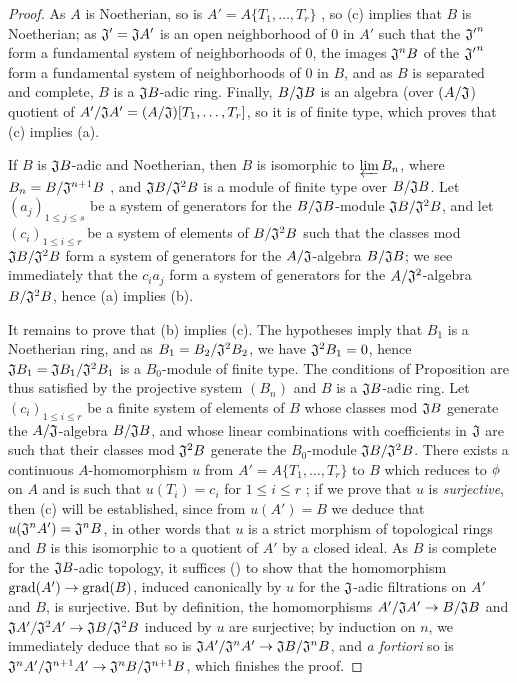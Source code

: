 \begin{proof}
\label{proof-0.7.5.5}
As $A$ is Noetherian, so is $A'=A\{T_1,\dots,T_r\}$ , so
(c) implies that $B$ is Noetherian; as $\mathfrak{J}'=\mathfrak{J}A'$ is an open neighborhood
of $0$ in $A'$ such that the ${\mathfrak{J}'}^n$ form a fundamental system of neighborhoods of
$0$, the images $\mathfrak{J}^n B$ of the ${\mathfrak{J}'}^n$ form a fundamental system of
neighborhoods of $0$ in $B$, and as $B$ is separated and complete, $B$ is a $\mathfrak{J}B$-adic
ring. Finally, $B/\mathfrak{J}B$ is an algebra (over $(A/\mathfrak{J}$) quotient of
$A'/\mathfrak{J}A'=(A/\mathfrak{J})[T_1,\dots,T_r]$, so it is of finite type, which proves that
(c) implies (a).

If $B$ is $\mathfrak{J}B$-adic and Noetherian, then $B$ is isomorphic to $\varprojlim B_n$, where
$B_n=B/\mathfrak{J}^{n+1}B$ , and $\mathfrak{J}B/\mathfrak{J}^2 B$
is a module of finite type over $B/\mathfrak{J}B$. Let $(a_j)_{1\leqslant j\leqslant s}$ be a
system of generators for the $B/\mathfrak{J}B$-module $\mathfrak{J}B/\mathfrak{J}^2 B$, and let
$(c_i)_{1\leqslant i\leqslant r}$ be a system of elements of $B/\mathfrak{J}^2 B$ such that the
classes
mod $\mathfrak{J}B/\mathfrak{J}^2 B$ form a system of generators for the $A/\mathfrak{J}$-algebra
$B/\mathfrak{J}B$; we see immediately that the $c_i a_j$ form a system of generators for the
$A/\mathfrak{J}^2$-algebra $B/\mathfrak{J}^2 B$, hence (a) implies (b).

It remains to prove that (b) implies (c). The hypotheses imply that $B_1$ is a Noetherian ring, and
as $B_1=B_2/\mathfrak{J}^2 B_2$, we have $\mathfrak{J}^2 B_1=0$, hence
$\mathfrak{J}B_1=\mathfrak{J}B_1/\mathfrak{J}^2 B_1$ is a $B_0$-module of finite type. The
conditions of Proposition  are thus satisfied by the projective
system $(B_n)$ and $B$ is a $\mathfrak{J}B$-adic ring. Let $(c_i)_{1\leqslant i\leqslant r}$ be a
finite system of elements of $B$ whose classes mod $\mathfrak{J}B$ generate the
$A/\mathfrak{J}$-algebra $B/\mathfrak{J}B$, and whose linear combinations with coefficients in
$\mathfrak{J}$ are such that their classes mod $\mathfrak{J}^2 B$ generate the $B_0$-module
$\mathfrak{J}B/\mathfrak{J}^2 B$. There exists a continuous $A$-homomorphism $u$ from
$A'=A\{T_1,\dots,T_r\}$ to $B$ which reduces to $\phi$ on $A$ and is such that $u(T_i)=c_i$ for
$1\leqslant i\leqslant r$ ; if we prove that $u$ is \emph{surjective},
then (c) will be established, since from $u(A')=B$ we deduce that
$u(\mathfrak{J}^n A')=\mathfrak{J}^n B$, in other words that $u$ is a strict morphism of topological
rings and $B$ is this isomorphic to a quotient of $A'$ by a closed ideal. As $B$ is complete for the
$\mathfrak{J}B$-adic topology, it suffices (\cite[p.~18--07]{I-1}) to show that the homomorphism
$\grad(A')\to\grad(B)$, induced canonically by $u$ for the $\mathfrak{J}$-adic filtrations on
$A'$ and $B$, is surjective. But by definition, the homomorphisms
$A'/\fk{J}A'\to B/\fk{J}B$ and
$\fk{J}A'/\fk{J}^2 A'\to\fk{J}B/\fk{J}^2 B$ induced by $u$ are surjective;
by induction on $n$, we immediately deduce that so is
$\fk{J}A'/\fk{J}^n A'\to\fk{J}B/\fk{J}^n B$, and \emph{a fortiori} so is
$\fk{J}^n A'/\fk{J}^{n+1}A'\to\fk{J}^n B/\fk{J}^{n+1}B$, which finishes the
proof.
\end{proof}

